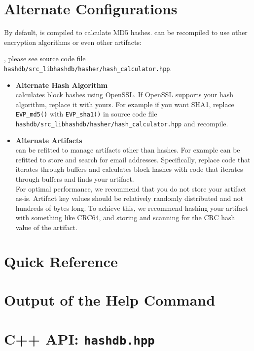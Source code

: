 \documentclass[11pt,fleqn]{article} %
\begin{document}
\section{Alternate Configurations}
By default, \hdb is compiled to calculate MD5 hashes. \hdb can be recompiled to use other encryption algorithms or even other artifacts:

, please see source code file \verb+hashdb/src_libhashdb/hasher/hash_calculator.hpp+.
\begin{itemize}
\item \textbf{Alternate Hash Algorithm}\\
\hdb calculates block hashes using OpenSSL. If OpenSSL supports your hash algorithm, replace it with yours.  For example if you want SHA1, replace \verb+EVP_md5()+ with \verb+EVP_sha1()+ in source code file \verb+hashdb/src_libhashdb/hasher/hash_calculator.hpp+ and recompile.
\item \textbf{Alternate Artifacts}\\
\hdb can be refitted to manage artifacts other than hashes. For example \hdb can be refitted to store and search for email addresses. Specifically, replace code that iterates through buffers and calculates block hashes with code that iterates through buffers and finds your artifact.\\

For optimal performance, we recommend that you do not store your artifact as-is. Artifact key values should be relatively randomly distributed and not hundreds of bytes long. To achieve this, we recommend hashing your artifact with something like CRC64, and storing and scanning for the CRC hash value of the artifact.
\end{itemize}

 


\newpage
\appendix
\appendixpage

\section{\hdb Quick Reference}
\label{QuickReference}

\newpage

\section{Output of the \hdb Help Command}
\label{HelpOutput}
\begingroup
\footnotesize
{
\selectfont

}
\endgroup


\section{\hdb C++ API: \texttt{hashdb.hpp}}
\label{hashdbapi}
\lstset{language=C++}
\lstset{basicstyle=\footnotesize}
\lstset{breaklines=true}
\lstset{breakatwhitespace=true}

\end{document}
